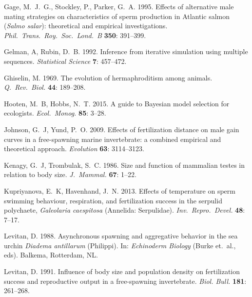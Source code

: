 \documentclass{article}
\begin{document}
\begin{thebibliography}{}
Gage, M.~J.~G., Stockley, P., Parker, G.~A. 1995.
\newblock Effects of alternative male mating strategies on characteristics of sperm production in Atlantic salmon (\textit{Salmo salar}): theoretical and empirical investigations.
\newblock \textit{Phil.~Trans.~Roy.~Soc.~Lond.~B} \textbf{350}: 391--399.

Gelman, A, Rubin, D.~B. 1992.
\newblock Inference from iterative simulation using multiple sequences.
\newblock \textit{Statistical Science} \textbf{7}: 457--472.

Ghiselin, M. 1969.
\newblock The evolution of hermaphroditism among animals.
\newblock \textit{Q.~Rev.~Biol.} \textbf{44}: 189--208.

Hooten, M.~B, Hobbs, N.~T. 2015.
\newblock A guide to Bayesian model selection for ecologists.
\newblock \textit{Ecol.~Monog.} \textbf{85}: 3--28.

Johnson, G.~J, Yund, P.~O. 2009.
\newblock Effects of fertilization distance on male gain curves in a free-spawning marine invertebrate: a combined empirical and theoretical approach.
\newblock \textit{Evolution} \textbf{63}: 3114--3123.

Kenagy, G.~J, Trombulak, S.~C. 1986.
\newblock Size and function of mammalian testes in relation to body size.
\newblock \textit{J.~Mammal.} \textbf{67}: 1--22.

Kupriyanova, E.~K, Havenhand, J.~N. 2013.
\newblock Effects of temperature on sperm swimming behaviour, respiration, and fertilization success in the serpulid polychaete, \textit{Galeolaria caespitosa} (Annelida: Serpulidae).
\newblock \textit{Inv.~Repro.~Devel.} \textbf{48}: 7--17.

Levitan, D. 1988.
\newblock Asynchronous spawning and aggregative behavior in the sea urchin \textit{Diadema antillarum} (Philippi).
\newblock In: \textit{Echinoderm Biology} (Burke et.~al., eds). Balkema, Rotterdam, NL.

Levitan, D. 1991.
\newblock Influence of body size and population density on fertilization success and reproductive output in a free-spawning invertebrate.
\newblock \textit{Biol. Bull.} \textbf{181}: 261--268.


\end{thebibliography}
\end{document}
